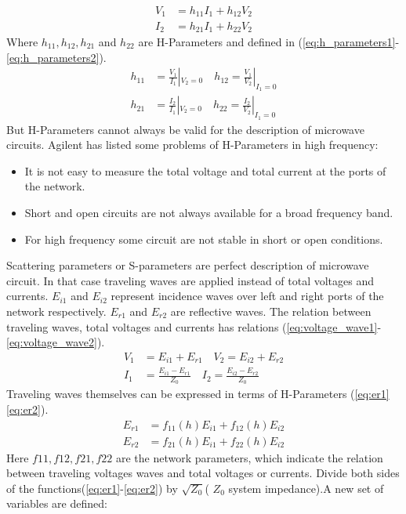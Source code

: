 \begin{align}
V_{1}&=h_{11}I_{1}+h_{12}V_{2}\\
I_{2}&=h_{21}I_{1}+h_{22}V_{2}
\label{eq:voltage_current}
\end{align}
Where $h_{11},h_{12},h_{21}$ and $h_{22}$ are H-Parameters and defined in (\ref{eq:h_parameters1}-\ref{eq:h_parameters2}).
\begin{align}
h_{11}&=\frac{V_{1}}{I_{1}}|_{V_{2}=0}\quad h_{12}=\frac{V_{1}}{V_{2}}|_{I_{1}=0}
\label{eq:h_parameters1}\\
h_{21}&=\frac{I_{2}}{I_{1}}|_{V_{2}=0}\quad h_{22}=\frac{I_{2}}{V_{2}}|_{I_{1}=0}
\label{eq:h_parameters2}
\end{align}
But H-Parameters cannot always be valid for the description of microwave circuits. Agilent\cite{aglient_s_parameters} has listed some problems of H-Parameters in high frequency:
\begin{itemize}
\item It is not easy to measure the total voltage and total current at the ports of the network.
\item Short and open circuits are not always available for a broad frequency band.
\item For high frequency some circuit are not stable in short or open conditions.
\end{itemize}
Scattering parameters or S-parameters are perfect description of microwave circuit\cite{RF194_s_parameters}. In that case traveling waves are applied instead of total voltages and currents. $E_{i1}$ and $E_{i2}$ represent incidence waves over left and right ports of the network respectively. $E_{r1}$ and $E_{r2}$ are reflective waves. The relation between traveling waves, total voltages and currents has relations (\ref{eq:voltage_wave1}-\ref{eq:voltage_wave2}).
\begin{align}
V_{1}&=E_{i1}+E_{r1}\quad V_{2}=E_{i2}+E_{r2}
\label{eq:voltage_wave1}\\
I_{1}&=\frac{E_{i1}-E_{r1}}{Z_{0}}\quad I_{2}=\frac{E_{i2}-E_{r2}}{Z_{0}}
\label{eq:voltage_wave2}
\end{align}
Traveling waves themselves can be expressed in terms of H-Parameters (\ref{eq:er1}\ref{eq:er2}). 
\begin{align}
E_{r1}&=f_{11}(h)E_{i1}+f_{12}(h)E_{i2}
\label{eq:er1}
\\
E_{r2}&=f_{21}(h)E_{i1}+f_{22}(h)E_{i2}
\label{eq:er2}
\end{align}
Here $f11, f12, f21, f22$ are the network parameters, which indicate the relation between traveling voltages waves and total voltages or currents. Divide both sides of the functions(\ref{eq:er1}-\ref{eq:er2}) by $\sqrt{Z_{0}}$( $Z_{0}$ system impedance).A new set of variables are defined:
